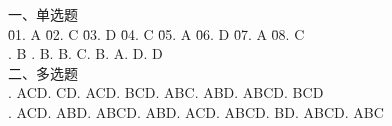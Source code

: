 \documentclass[a4paper]{article}
\begin{document}
\begin{tabbing}
一、单选题\\
\= 01. A \qquad \= 02. C \qquad \= 03. D \qquad \= 04. C \qquad \= 05. A \qquad \= 06. D \qquad \= 07. A \qquad \= 08. C \qquad \= \\
. B . B. B. C. B. A. D. D\\
二、多选题\\
. ACD. CD. ACD. BCD. ABC. ABD. ABCD. BCD\\
. ACD. ABD. ABCD. ABD. ACD. ABCD. BD. ABCD. ABC\\
\end{tabbing}
\end{document}
